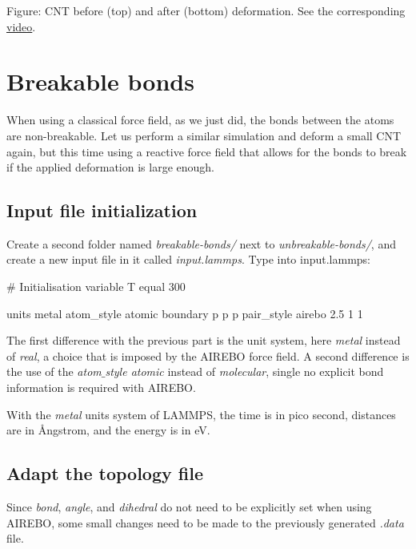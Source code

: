 \vspace{0.25cm} Figure: CNT before (top) and after (bottom) deformation. See the corresponding \href{https://youtu.be/S05nzreQR18}{video}.

\section{Breakable bonds}
\noindent When using a classical force field, as we just did, the bonds between the atoms 
are non-breakable. Let us perform a similar simulation and deform a small CNT again,
but this time using a reactive force field that allows for the bonds to break
if the applied deformation is large enough.

\subsection{Input file initialization}
\noindent Create a second folder named \textit{breakable-bonds/} next to \textit{unbreakable-bonds/},
and create a new input file in it called \textit{input.lammps}. Type into input.lammps:

\begin{lcverbatim}
# Initialisation
variable T equal 300

units metal
atom_style atomic
boundary p p p
pair_style airebo 2.5 1 1
\end{lcverbatim}

\noindent The first difference with the previous part
is the unit system, here \textit{metal} instead of \textit{real}, a choice
that is imposed by the AIREBO force field. A second difference
is the use of the \textit{atom$\_$style atomic} instead of \textit{molecular},
single no explicit bond information is required with AIREBO.

\begin{tcolorbox}[colback=mylightblue!5!white,colframe=mylightblue!75!black,title=About metal units]

\vspace{0.25cm} \noindent With the \textit{metal} units system of LAMMPS, the time is in pico second, 
distances are in Ångstrom, and the energy is in eV.
\end{tcolorbox}

\subsection{Adapt the topology file}
Since \textit{bond}, \textit{angle}, and \textit{dihedral} do not need to be explicitly
set when using AIREBO, some small changes need to be made to the 
previously generated \textit{.data} file.

